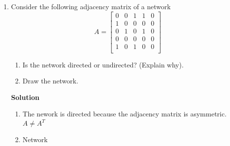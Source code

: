 \documentclass{amsart}
\theoremstyle{definition}
\theoremstyle{remark}
\numberwithin{equation}{section}
\begin{document}
\clearpage
\begin{enumerate}

\item Consider the following adjacency matrix of a network
\begin{equation*}
{A}  = \left\lbrack\begin{array}{ccccc}
0 & 0 & 1 & 1 & 0 \\
1 & 0 & 0 & 0 & 0 \\
0 & 1 & 0 & 1 & 0 \\
0 & 0 & 0 & 0 & 0 \\
1 & 0 & 1 & 0 & 0 \\
\end{array}\right\rbrack
\end{equation*}

\begin{enumerate}
\item Is the network directed or undirected? (Explain why).
\item Draw the network.
\end{enumerate}

\vspace{1cm}

\textbf{ \larger[3]Solution} 
\vspace{0.5cm}
\begin{enumerate}
    \item The nework is directed because the adjacency matrix is asymmetric.
$ A \neq A^T$
\vspace{1cm}
    \item Network
    


\end{enumerate}
\end{enumerate}
\end{document}
